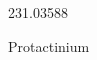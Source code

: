 \documentclass[12pt]{article}
\begin{document}
\hfill{}
\vfill
\begin{center}
  {\fontsize{50}{60}
  }

  \vspace{1em}

  231.03588

Protactinium
\end{center}
\vfill
\end{document}

